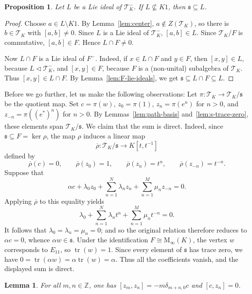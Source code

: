 \documentclass[11pt]{article}
\numberwithin{equation}{section}
\theoremstyle{plain}
\newtheorem{lemma}[theorem]{Lemma}
\newtheorem{proposition}[theorem]{Proposition}
\theoremstyle{definition}
\numberwithin{equation}{section}
\newcommand{\T}{\mathscr T_K}
\begin{document}
\begin{proposition}\label{prop:noncentral-contains-s}
Let $L$ be a Lie ideal of $\T^-$. If $L\not\subseteq K1$, then $\mathfrak s\subseteq L$.
\end{proposition}

\begin{proof}
Choose $a\in L\setminus K1$. By Lemma~\ref{lem:center}, $a\notin Z(\T)$, so there is $b\in\T$ with $[a,b]\neq0$. Since $L$ is a Lie ideal of $\T^-$, $[a,b]\in L$. Since $\T/F$ is commutative, $[a,b]\in F$. Hence $L\cap F\neq0$.

Now $L\cap F$ is a Lie ideal of $F^-$. Indeed, if $x\in L\cap F$ and $y\in F$, then $[x,y]\in L$, because $L\triangleleft\T^-$, and $[x,y]\in F$, because $F$ is a (non-unital) subalgebra of $\T$. Thus $[x,y]\in L\cap F$. By Lemma~\ref{lem:F-lie-ideals}, we get $\mathfrak s\subseteq L\cap F\subseteq L$.
\end{proof}


Before we go further, let us make the following observations: Let $\pi:\T\to\T/\mathfrak s$ be the quotient map. Set
$c=\pi(w)$, $z_0=\pi(1)$, $z_n=\pi(e^n)$ for $n>0$, and
$z_{-n}=\pi((e^*)^n)$ for $n>0$. By
Lemmas~\ref{lem:path-basis} and~\ref{lem:s-trace-zero}, these elements
span $\T/\mathfrak s$. We claim that the sum is direct. Indeed, since $\mathfrak s\subseteq F=\ker\rho$, the map $\rho$ induces a
linear map
$$
\overline{\rho}:\T/\mathfrak s\longrightarrow K[t,t^{-1}]
$$
defined by
$$
\overline{\rho}(c)=0,\qquad
\overline{\rho}(z_0)=1,\qquad
\overline{\rho}(z_n)=t^n,\qquad
\overline{\rho}(z_{-n})=t^{-n}.
$$
Suppose that
$$
\alpha c+\lambda_0z_0
+\sum_{n=1}^{N}\lambda_nz_n
+\sum_{n=1}^{M}\mu_nz_{-n}=0.
$$
Applying $\overline{\rho}$ to this equality yields
$$
\lambda_0+\sum_{n=1}^{N}\lambda_nt^n
+\sum_{n=1}^{M}\mu_nt^{-n}=0.
$$
It follows that $\lambda_0=\lambda_n=\mu_n=0$; and so the original relation therefore reduces to $\alpha c=0$, whence $\alpha w\in\mathfrak s$. Under the identification $F\cong\mathrm M_\infty(K)$, the vertex $w$ corresponds to $E_{11}$, so $\operatorname{tr}(w)=1$. Since every element of $\mathfrak s$ has trace zero, we have $0=\operatorname{tr}(\alpha w)=\alpha\operatorname{tr}(w)=\alpha$. Thus all the coefficients vanish, and the displayed sum is direct.

\begin{lemma}\label{lem:bracket-quotient}
For all $m,n\in\mathbb Z$, one has $[z_m,z_n]=-m\delta_{m+n,0}c$ and $[c,z_n]=0$.
\end{lemma}
\end{document}

